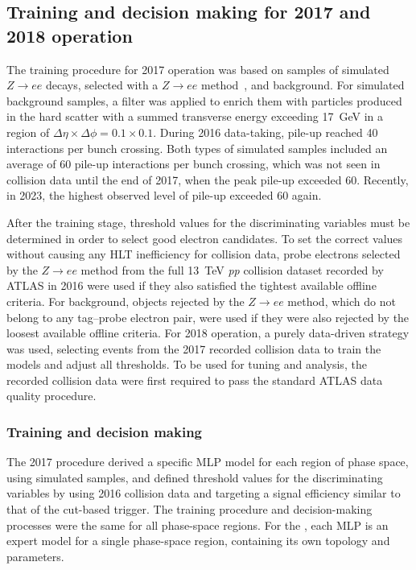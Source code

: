 \subsection{Training and decision making for 2017 and 2018 operation}%
\label{sec:tuning}


The training procedure for 2017 operation was based on samples of simulated $Z\rightarrow ee$ decays, selected with a $Z\rightarrow ee$ \tnp method~\cite{TRIG-2018-05}, and background. For simulated background samples, a filter was applied to enrich them with particles produced in the hard scatter with a summed transverse energy exceeding 17~GeV in a region of $\Delta\eta\times\Delta\phi=0.1\times0.1$. During 2016 data-taking, pile-up reached 40 interactions per bunch crossing.
Both types of simulated samples included an average of 60 pile-up interactions per bunch crossing, which was not seen in collision data until the end of 2017, when the peak pile-up exceeded 60. Recently, in 2023, the highest observed level of pile-up exceeded 60 again.

After the training stage, threshold values for the discriminating variables must be determined in order to select good electron candidates. To set the correct values without causing any HLT inefficiency for collision data, probe electrons selected by the $Z\rightarrow ee$ \tnp method from the full 13~TeV \textit{pp} collision dataset recorded by ATLAS in 2016 were used if they also satisfied the tightest available offline criteria. For background, objects rejected by the $Z\rightarrow ee$ \tnp method, which do not belong to any tag--probe electron pair, were used if they were also rejected by the loosest available offline criteria. For 2018 operation, a purely data-driven strategy was used, selecting events from the 2017 recorded collision data to train the models and adjust all thresholds. To be used for tuning and analysis, the recorded collision data were first required to pass the standard ATLAS data quality procedure. 


\subsubsection{Training and decision making}%

The 2017 procedure derived a specific MLP model for each region of \eteta phase space, using simulated samples, and defined threshold values for the discriminating variables by using 2016 collision data and targeting a signal efficiency similar to that of the cut-based trigger. The training procedure and decision-making processes were the same for all phase-space regions. For the \rnn{}, each MLP is an expert model for a single phase-space region, containing its own topology and parameters.

